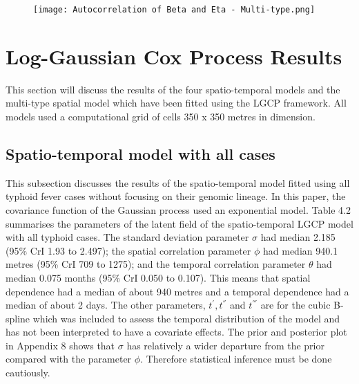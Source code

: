 \documentclass[12pt,a4paper]{report}
\begin{document}
\begin{figure}[H]
\begin{center}
\texttt{[image: Autocorrelation of Beta and Eta - Multi-type.png]}
\end{center}
\end{figure}

\section{Log-Gaussian Cox Process Results}

This section will discuss the results of the four spatio-temporal models and the multi-type spatial model which have been fitted using the LGCP framework. All models used a computational grid of cells 350 x 350 metres in dimension. 

\subsection{Spatio-temporal model with all cases}

This subsection discusses the results of the spatio-temporal model fitted using all typhoid fever cases without focusing on their genomic lineage. In this paper, the covariance function of the Gaussian process used an exponential model. Table 4.2 summarises the parameters of the latent field of the spatio-temporal LGCP model with all typhoid cases. The standard deviation parameter $\sigma$ had median 2.185 (95\% CrI 1.93 to 2.497); the spatial correlation parameter $\phi$ had median 940.1 metres (95\% CrI 709 to 1275); and the temporal correlation parameter $\theta$ had median 0.075 months (95\% CrI 0.050 to 0.107). This means that spatial dependence had a median of about 940 metres and a temporal dependence had a median of about 2 days. The other parameters, $t^{'}, t^{''}$ and $t^{'''}$ are for the cubic B-spline which was included to assess the temporal distribution of the model and has not been interpreted to have a covariate effects. The prior and posterior plot in Appendix 8 shows that $\sigma$ has relatively a wider departure from the prior compared with the parameter $\phi$. Therefore statistical inference must be done cautiously.
\end{document}
